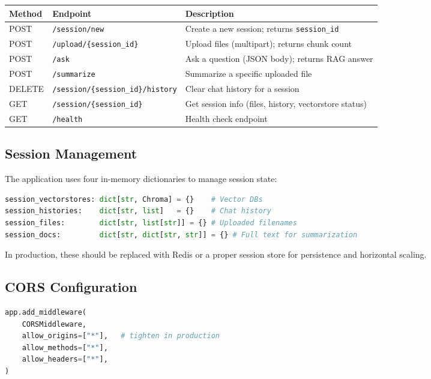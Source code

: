 \documentclass[12pt,a4paper]{article}
\begin{document}
\begin{longtable}{@{}p{1.5cm}p{4.5cm}p{7.5cm}@{}}
\toprule
\textbf{Method} & \textbf{Endpoint} & \textbf{Description} \\
\midrule
\endhead
POST & \texttt{/session/new} & Create a new session; returns \texttt{session\_id} \\
POST & \texttt{/upload/\{session\_id\}} & Upload files (multipart); returns chunk count \\
POST & \texttt{/ask} & Ask a question (JSON body); returns RAG answer \\
POST & \texttt{/summarize} & Summarize a specific uploaded file \\
DELETE & \texttt{/session/\{session\_id\}/history} & Clear chat history for a session \\
GET & \texttt{/session/\{session\_id\}} & Get session info (files, history, vectorstore status) \\
GET & \texttt{/health} & Health check endpoint \\
\bottomrule
\end{longtable}

\subsection{Session Management}

The application uses four in-memory dictionaries to manage session state:

\begin{lstlisting}[language=Python, caption={Session state stores}]
session_vectorstores: dict[str, Chroma] = {}    # Vector DBs
session_histories:    dict[str, list]   = {}    # Chat history
session_files:        dict[str, list[str]] = {} # Uploaded filenames
session_docs:         dict[str, dict[str, str]] = {} # Full text for summarization
\end{lstlisting}

\begin{notebox}
In production, these should be replaced with Redis or a proper session store for persistence and horizontal scaling.
\end{notebox}

\subsection{CORS Configuration}

\begin{lstlisting}[language=Python, caption={CORS middleware}]
app.add_middleware(
    CORSMiddleware,
    allow_origins=["*"],   # tighten in production
    allow_methods=["*"],
    allow_headers=["*"],
)
\end{lstlisting}
\end{document}
